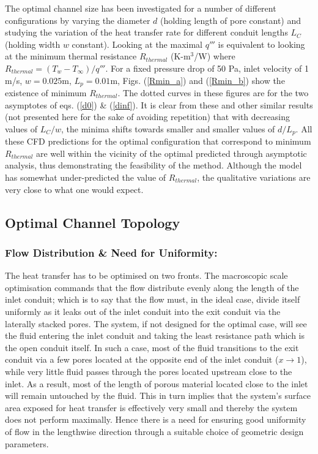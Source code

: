 \documentclass[twocolumn,10pt,cleanfoot]{ihmtc}
\begin{document}
%
%
The optimal channel size has been investigated for a number of different configurations by varying the diameter $ d $ (holding length of pore constant) and studying the variation of the heat transfer rate for different conduit lengths $L_C$ (holding width $w$ constant). Looking at the maximal $ q''' $ is equivalent to looking at the minimum thermal resistance $ R_{thermal} $ (K-m$^3$/W) where $ R_{thermal}=(T_w-T_{\infty})/q''' $. For a fixed pressure drop of 50 Pa, inlet velocity of 1 m/s, $w=0.025$m, $L_p=0.01$m, Figs. (\ref{Rmin_a}) and (\ref{Rmin_b}) show the existence of minimum $R_{thermal}$. The dotted curves in these figures are for the two asymptotes of eqs. (\ref{d0}) \& (\ref{dinf}). It is clear from these and other similar results (not presented here for the sake of avoiding repetition) that with decreasing values of $L_C/w$, the minima shifts towards smaller and smaller values of $d/L_p$. All these CFD predictions for the optimal configuration that correspond to minimum $R_{thermal}$ are well within the vicinity of the optimal predicted through asymptotic analysis, thus demonstrating the feasibility of the method.  Although the model has somewhat under-predicted the value of $R_{thermal}$, the qualitative variations are very close to what one would expect.
%
\subsection{Optimal Channel Topology}\label{choiceofdesign}
\subsubsection*{Flow Distribution \& Need for Uniformity:} The heat transfer has to be optimised on two fronts. The macroscopic scale optimisation commands that the flow distribute evenly along the length of the inlet conduit; which is to say that the flow must, in the ideal case, divide itself uniformly as it leaks out of the inlet conduit into the exit conduit via the laterally stacked pores. The system, if not designed for the optimal case, will see the fluid entering the inlet conduit and taking the least resistance path which is the open conduit itself. In such a case, most of the fluid transitions to the exit conduit via a few pores located at the opposite end of the inlet conduit ($x \rightarrow 1$), while very little fluid passes through the pores located upstream close to the inlet. As a result, most of the length of porous material located close to the inlet will remain untouched by the fluid. This in turn implies that the system's surface area exposed for heat transfer is effectively very small and thereby the system does not perform maximally. Hence there is a need for ensuring good uniformity of flow in the lengthwise direction through a suitable choice of geometric design parameters.
%
\end{document}
